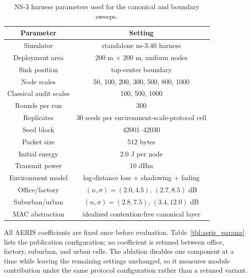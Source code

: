 \documentclass[conference]{IEEEtran}
\begin{document}
\begin{table}[t]
\caption{NS-3 harness parameters used for the canonical and boundary sweeps.}
\label{tbl:ns3_params}
\centering
\scriptsize
\setlength{\tabcolsep}{2pt}
\begin{tabular*}{\columnwidth}{@{\extracolsep{\fill}}cc@{}}
\toprule
Parameter & Setting \\ 
\midrule
Simulator & standalone ns-3.40 harness \\
Deployment area & 200 m $\times$ 200 m, uniform nodes \\
Sink position & top-center boundary \\
Node scales & 50, 100, 200, 300, 500, 800, 1000 \\
Classical audit scales & 100, 500, 1000 \\
Rounds per run & 300 \\
Replicates & 30 seeds per environment-scale-protocol cell \\
Seed block & 42001--42030 \\
Packet size & 512 bytes \\
Initial energy & 2.0 J per node \\
Transmit power & 10 dBm \\
Environment model & log-distance loss + shadowing + fading \\
Office/factory & $(n,\sigma)=(2.0,4.5)$, $(2.7,8.5)$ dB \\
Suburban/urban & $(n,\sigma)=(2.8,7.5)$, $(3.4,12.0)$ dB \\
MAC abstraction & idealized contention-free canonical layer \\
\bottomrule
\end{tabular*}
\end{table}

All AERIS coefficients are fixed once before evaluation. Table~\ref{tbl:aeris_params} lists the publication configuration; no coefficient is retuned between office, factory, suburban, and urban cells. The ablation disables one component at a time while leaving the remaining settings unchanged, so it measures module contribution under the same protocol configuration rather than a retuned variant.
\end{document}
